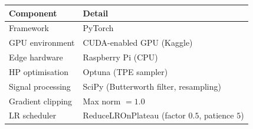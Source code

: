 \documentclass[conference]{IEEEtran}
\begin{document}
\begin{table}[H]
\centering
\begin{tabular}{ll}
\toprule
\textbf{Component} & \textbf{Detail} \\
\midrule
Framework             & PyTorch                                  \\
GPU environment       & CUDA-enabled GPU (Kaggle)                \\
Edge hardware         & Raspberry Pi (CPU)                       \\
HP optimisation       & Optuna (TPE sampler)                     \\
Signal processing     & SciPy (Butterworth filter, resampling)   \\
Gradient clipping     & Max norm $= 1.0$                         \\
LR scheduler          & ReduceLROnPlateau (factor $0.5$, patience $5$) \\
\bottomrule
\end{tabular}
\end{table}

% 
% 
\end{document}

